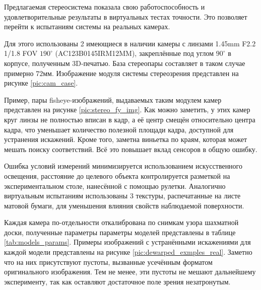 
Предлагаемая стереосистема показала свою работоспособность и удовлетворительные результаты в виртуальных тестах 
точности. Это позволяет перейти к испытаниям системы на реальных камерах. 

Для этого использованы 2 имеющиеся в наличии камеры %
с линзами 1.45mm F2.2 1/1.8 FOV $190^\circ$ (AC123B0145IRM12MM), закреплённые под углом $90^\circ$ в корпусе,
полученным 3D-печатью. База стереопары составляет в таком случае примерно  $72мм$. Изображение модуля системы 
стереозрения представлен на рисунке \ref{pic:cam_case}. 

Пример, пары fisheye-изображений, выдаваемых таким модулем камер представлен на рисунке \ref{pic:stereo_fy_img}. 
Как можно заметить, у этих камер круг линзы не полностью вписан в кадр, а её центр смещён относительно центра кадра,
 что уменьшает количество полезной площади кадра, доступной для устранения искажений. Кроме того, заметна виньетка 
по краям, которая может мешать поиску соответствий. Всё это повышает вклад сенсоров в общую ошибку. 




Ошибка условий измерений минимизируется использованием искусственного освещения, расстояние до целевого объекта
контролируется разметкой на экспериментальном столе, нанесённой с помощью рулетки. Аналогично виртуальным испытаниям 
использованы 3 текстуры, распечатанные на листе матовой бумаги, для уменьшения влияния свойств наблюдаемой поверхности.

Каждая камера по-отдельности откалибрована по снимкам узора шахматной доски, полученные параметры параметры моделей 
представлены в таблице \ref{tab:models_params}. Примеры изображений с устранёнными искажениями для каждой модели представлены на рисунке
 \ref{pic:dewarped_exmples_real}. Заметно что на них присутствуют пустоты, вызванные усечённым форматом оригинального 
 изображения. Тем не менее, эти пустоты не мешают дальнейшему эксперименту, так как оставляют достаточное поле зрения 
 незатронутым.

